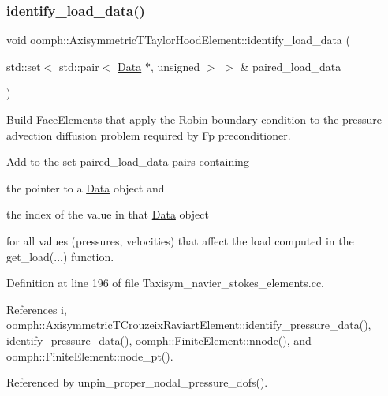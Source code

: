 \subsubsection{\texorpdfstring{identify\+\_\+load\+\_\+data()}{identify\_load\_data()}}
{\footnotesize\ttfamily void oomph\+::\+Axisymmetric\+T\+Taylor\+Hood\+Element\+::identify\+\_\+load\+\_\+data (\begin{DoxyParamCaption}\item[{std\+::set$<$ std\+::pair$<$ \hyperlink{classoomph_1_1Data}{Data} $\ast$, unsigned $>$ $>$ \&}]{paired\+\_\+load\+\_\+data }\end{DoxyParamCaption})}



Build Face\+Elements that apply the Robin boundary condition to the pressure advection diffusion problem required by Fp preconditioner. 

Add to the set {\ttfamily paired\+\_\+load\+\_\+data} pairs containing
\begin{DoxyItemize}
\item the pointer to a \hyperlink{classoomph_1_1Data}{Data} object and
\item the index of the value in that \hyperlink{classoomph_1_1Data}{Data} object
\end{DoxyItemize}for all values (pressures, velocities) that affect the load computed in the {\ttfamily get\+\_\+load}(...) function. 

Definition at line 196 of file Taxisym\+\_\+navier\+\_\+stokes\+\_\+elements.\+cc.



References i, oomph\+::\+Axisymmetric\+T\+Crouzeix\+Raviart\+Element\+::identify\+\_\+pressure\+\_\+data(), identify\+\_\+pressure\+\_\+data(), oomph\+::\+Finite\+Element\+::nnode(), and oomph\+::\+Finite\+Element\+::node\+\_\+pt().



Referenced by unpin\+\_\+proper\+\_\+nodal\+\_\+pressure\+\_\+dofs().

\mbox{\label{classoomph_1_1AxisymmetricTTaylorHoodElement_a20b2bcc3563aaa264601603a0d3b3604}} 
